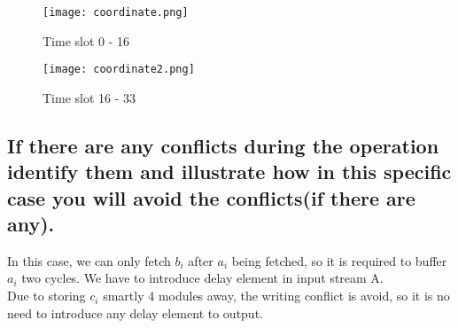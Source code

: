 \documentclass[12pt]{report}
\begin{document}
\begin{figure}
\texttt{[image: coordinate.png]}
\caption{Time slot 0 - 16}
\end{figure}

\begin{figure}
\texttt{[image: coordinate2.png]}
\caption{Time slot 16 - 33}
\end{figure}

\subsection{If there are any conflicts during the operation identify them and illustrate how in this specific case you will avoid the conflicts(if there are any).}

\begin{doublespace}
In this case, we can only fetch $b_{i}$ after $a_{i}$ being fetched, so it is required to buffer $a_{i}$ two cycles. We have to introduce  delay element in input stream A.\\
Due to storing $c_{i}$ smartly 4 modules away, the writing conflict is avoid, so it is no need to introduce any delay element to output.
\end{doublespace}
\end{document}
